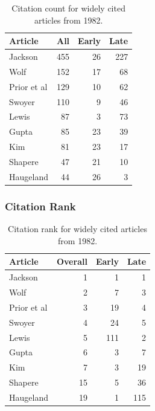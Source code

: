 \documentclass[
  10pt,
  letterpaper,
  DIV=11,
  numbers=noendperiod,
  twoside]{scrartcl}
\begin{document}
\begin{longtable}[]{@{}lrrr@{}}

\caption{\label{tbl-citation-count-1982}Citation count for widely cited
articles from 1982.}

\tabularnewline

\toprule\noalign{}
Article & All & Early & Late \\
\midrule\noalign{}
\endhead
\bottomrule\noalign{}
\endlastfoot
Jackson & 455 & 26 & 227 \\
Wolf & 152 & 17 & 68 \\
Prior et al & 129 & 10 & 62 \\
Swoyer & 110 & 9 & 46 \\
Lewis & 87 & 3 & 73 \\
Gupta & 85 & 23 & 39 \\
Kim & 81 & 23 & 17 \\
Shapere & 47 & 21 & 10 \\
Haugeland & 44 & 26 & 3 \\

\end{longtable}

\subsubsection*{Citation Rank}\label{sec-rank-1982}

\begin{longtable}[]{@{}lrrr@{}}

\caption{\label{tbl-citation-rank-1982}Citation rank for widely cited
articles from 1982.}

\tabularnewline

\toprule\noalign{}
Article & Overall & Early & Late \\
\midrule\noalign{}
\endhead
\bottomrule\noalign{}
\endlastfoot
Jackson & 1 & 1 & 1 \\
Wolf & 2 & 7 & 3 \\
Prior et al & 3 & 19 & 4 \\
Swoyer & 4 & 24 & 5 \\
Lewis & 5 & 111 & 2 \\
Gupta & 6 & 3 & 7 \\
Kim & 7 & 3 & 19 \\
Shapere & 15 & 5 & 36 \\
Haugeland & 19 & 1 & 115 \\

\end{longtable}
\end{document}
